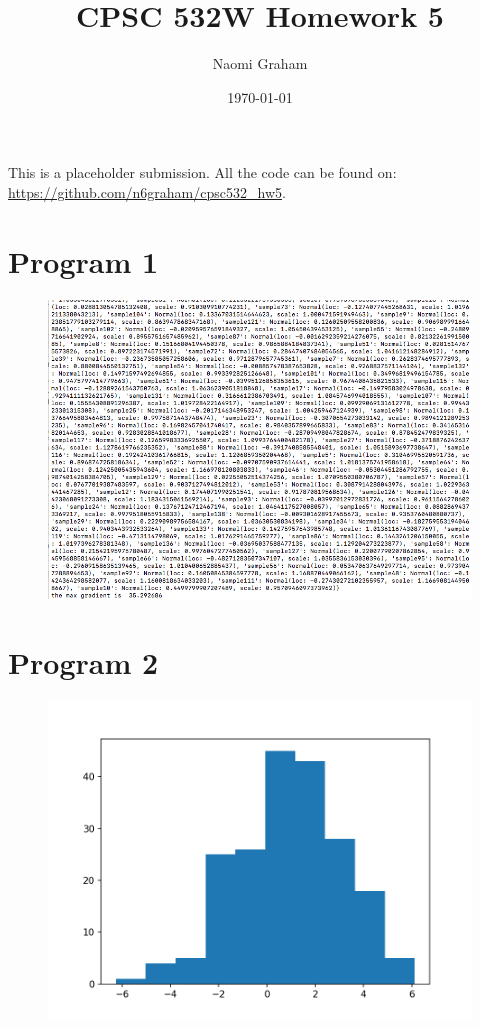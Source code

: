 \documentclass[12pt]{article}%
\theoremstyle{definition}
\begin{document}
	
	\title{CPSC 532W Homework 5}
	\author{Naomi Graham}
	\date{\today}
	\maketitle
	
	This is a placeholder submission. All the code can be found on: \url{https://github.com/n6graham/cpsc532_hw5}.
	
	

	\section{Program 1}
	
	\begin{figure}[h]
		\includegraphics[scale=0.6]{p1_screenshot}
	\end{figure}
	
	
	\newpage
	
	\section{Program 2}
	
	
	
	\begin{figure}[h]
			\includegraphics[scale=0.6]{program2_hist}
	\end{figure}
		
\end{document}
